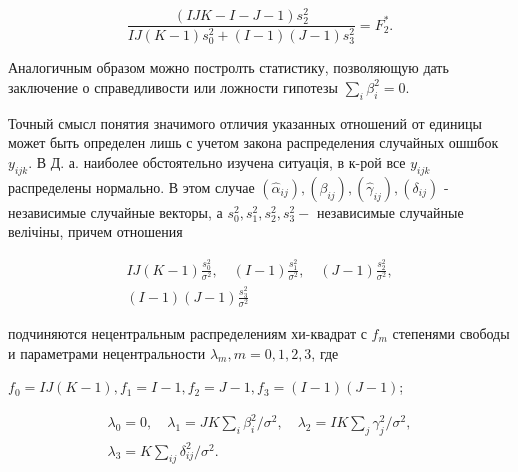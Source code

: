\documentclass[10pt]{article}
\begin{document}
\[

\frac{(I J K-I-J-1) s_{2}^{2}}{I J(K-1) s_{0}^{2}+(I-1)(J-1) s_{3}^{2}}=F_{2}^{*} .

\]



Аналогичным образом можно постролть статистику, позволяющую дать заключение о справедливости или ложности гипотезы $\sum_{i} \beta_{i}^{2}=0$.



Точный смысл понятия значимого отличия указанных отношений от единицы может быть определен лишь с учетом закона распределения случайных ошшбок $y_{i j k}$. В Д. а. наиболее обстоятельно изучена ситуація, в к-рой все $y_{i j k}$ распределены нормально. В этом случае $\left(\hat{\alpha}_{i j}\right),\left(\beta_{i j}\right),\left(\hat{\gamma}_{i j}\right),\left(\delta_{i j}\right)$ - независимые случайные векторы, а $s_{0}^{2}, s_{1}^{2}, s_{2}^{2}, s_{3}^{2}-$ независимые случайные велічіны, причем отношения



\[

\begin{gathered}

I J(K-1) \frac{s_{0}^{2}}{\sigma^{2}}, \quad(I-1) \frac{s_{1}^{2}}{\sigma^{2}}, \quad(J-1) \frac{s_{2}^{2}}{\sigma^{2}}, \\

(I-1)(J-1) \frac{s_{3}^{2}}{\sigma^{2}}

\end{gathered}

\]



подчиняются нецентральным распределениям хи-квадрат с $f_{m}$ степенями свободы и параметрами нецентральности $\lambda_{m}, m=0,1,2,3$, где



$f_{0}=I J(K-1), f_{1}=I-1, f_{2}=J-1, f_{3}=(I-1)(J-1)$;



\[

\begin{gathered}

\lambda_{0}=0, \quad \lambda_{1}=J K \sum_{i} \beta_{i}^{2} / \sigma^{2}, \quad \lambda_{2}=I K \sum_{j} \gamma_{j}^{2} / \sigma^{2}, \\

\lambda_{3}=K \sum_{i j} \delta_{i j}^{2} / \sigma^{2} .

\end{gathered}

\]
\end{document}
